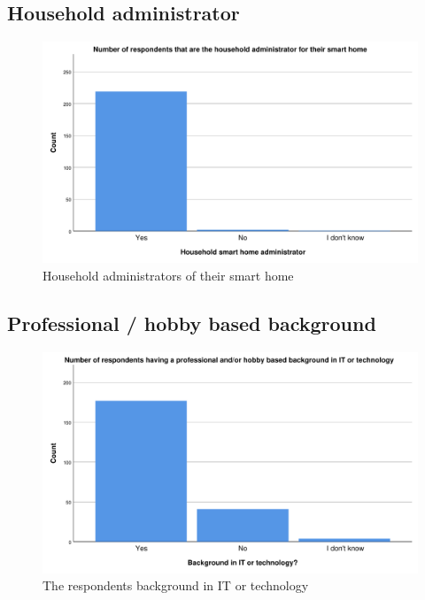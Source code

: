 \subsection{Household administrator}

\begin{figure}[H]
    \centering
    \includegraphics[scale=0.55]{figures/diagrams/administrator.pdf}
    \caption{Household administrators of their smart home}
    \label{fig:administrator}
\end{figure}

\subsection{Professional / hobby based background}

\begin{figure}[H]
    \centering
    \includegraphics[scale=0.55]{figures/diagrams/background.pdf}
    \caption{The respondents background in IT or technology}
    \label{fig:background}
\end{figure}

